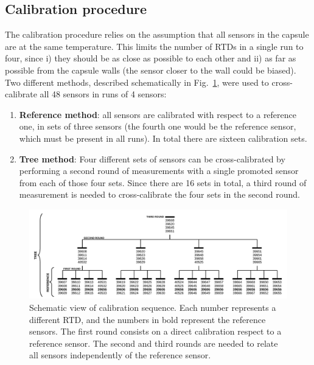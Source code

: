 
\subsection{Calibration procedure}
\label{sec:calib_procedure}

\noindent The calibration procedure relies on the assumption that all sensors in the capsule are at the same temperature. This limits the number of RTDs in a single run to four, since i) they should be as close as possible to each other and ii) as far as possible from the capsule walls (the sensor closer to the wall could be biased). Two different methods, described schematically in Fig.~\ref{fi:CAL_sequence}, were used to cross-calibrate all 48 sensors in runs of 4 sensors: 

\begin{enumerate}
\item {\bf Reference method}: all sensors are calibrated with respect to a reference one, in sets of three sensors (the fourth one would be the reference sensor, which must be present in all runs). In total there are sixteen calibration sets. 
\item {\bf Tree method}: Four different sets of sensors can be cross-calibrated by performing a second round of measurements with a single promoted sensor from each of those four sets. Since there are 16 sets in total, a third round of measurement is needed to cross-calibrate the four sets in the second round. 
\end{enumerate}

\begin{figure}[htbp]
\centering
\includegraphics[width=\textwidth]{images/figure_6.pdf}
\caption{Schematic view of calibration sequence. Each number represents a different RTD, and the numbers in bold represent the reference sensors. The first round consists on a direct calibration respect to a reference sensor. The second and third rounds are needed to relate all sensors independently of the reference sensor.
\label{fi:CAL_sequence}}
\end{figure}

